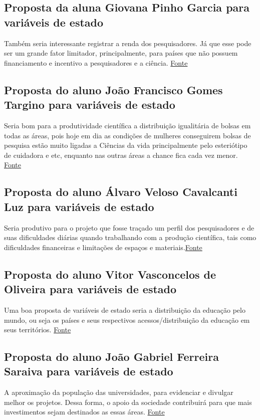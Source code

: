 \subsection{Proposta da aluna Giovana Pinho Garcia para variáveis de estado}
Também seria interessante registrar a renda dos pesquisadores. Já que esse pode ser um grande fator limitador, principalmente, para países que não possuem financiamento e incentivo a pesquisadores e a ciência. \href{https://www.ufg.br/n/129177-baixo-investimento-em-ciencia-e-tecnologia-eleva-a-desigualdade-social}{Fonte}

\subsection{Proposta do aluno João Francisco Gomes Targino para variáveis de estado}
Seria bom para a produtividade científica a distribuição igualitária de bolsas em todas as áreas, pois hoje em dia as condições de mulheres conseguirem bolsas de pesquisa estão muito ligadas a Ciências da vida principalmente pelo esteriótipo de cuidadora e etc, enquanto nas outras áreas a chance fica cada vez menor.
\href{https://sites.usp.br/psicousp/desequilibrio-de-genero-afeta-mulheres-cientistas-brasil/}{Fonte}

\subsection{Proposta do aluno Álvaro Veloso Cavalcanti Luz para variáveis de estado}
Seria produtivo para o projeto que fosse traçado um perfil dos pesquisadores e de suas dificuldades diárias quando trabalhando com a produção científica, tais como dificuldades financeiras e limitações de espaços e materiais.\href{https://www.labnetwork.com.br/especiais/o-desafio-de-fazer-pesquisa-cientifica-no-brasil/}{Fonte}

\subsection{Proposta do aluno Vitor Vasconcelos de Oliveira para variáveis de estado}
Uma boa proposta de variáveis de estado seria a distribuição da educação pelo mundo, ou seja os países e seus respectivos acessos/distribuição da educação em seus territórios.
\href{https://agenciadenoticias.ibge.gov.br/agencia-noticias/2012-agencia-de-noticias/noticias/22842-acesso-a-educacao-ainda-e-desigual}{Fonte}

\subsection{Proposta do aluno João Gabriel Ferreira Saraiva para variáveis de estado}
A aproximação da população das universidades, para evidenciar e divulgar melhor os projetos. Dessa forma, o apoio da sociedade contribuirá para que mais investimentos sejam destinados as essas áreas.
\href{Dessa forma, o apoio da sociedade contribuirá para que mais investimentos sejam destinados as essas áreas.}{Fonte}

